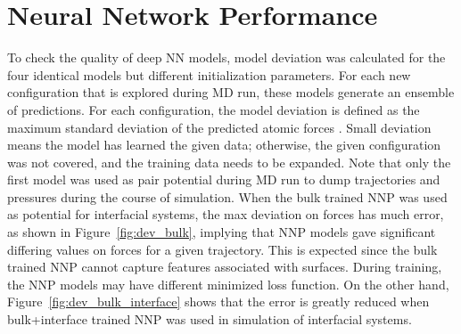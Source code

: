 \section{Neural Network Performance}
To check the quality of deep NN models, model deviation was calculated for the
four identical models but different initialization parameters. For each
new configuration that is explored during MD run, these models
generate an ensemble of predictions. For each configuration,
the model deviation is defined as the maximum standard deviation of the
predicted atomic forces \cite{zhang2019active,zeng2023deepmd}.  Small deviation means the model has learned the given data; otherwise, the given configuration was not covered, and the training data needs to be expanded. Note that  only the  first
model was used as pair potential during MD run to dump trajectories and
pressures during the course of simulation. When the bulk trained NNP was
used as potential for interfacial systems, the max deviation on forces has much
error, as shown in Figure~\ref{fig:dev_bulk}, implying that NNP models gave
significant differing values on forces for
a given trajectory. This is expected since the bulk trained NNP cannot
capture features associated with surfaces. During training, the NNP models may
have different minimized loss function. On the other hand,
Figure~\ref{fig:dev_bulk_interface} shows that the error is greatly reduced
when bulk+interface trained NNP was used in simulation of interfacial systems.

